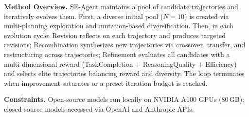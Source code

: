 \begin{tcolorbox}
\smallskip
\textbf{Method Overview.} SE-Agent maintains a pool of candidate trajectories and iteratively evolves them. First, a diverse initial pool ($N=10$) is created via multi-planning exploration and mutation-based diversification. Then, in each evolution cycle: Revision reflects on each trajectory and produces targeted revisions; Recombination synthesizes new trajectories via crossover, transfer, and restructuring across trajectories; Refinement evaluates all candidates with a multi-dimensional reward (TaskCompletion $+$ ReasoningQuality $+$ Efficiency) and selects elite trajectories balancing reward and diversity. The loop terminates when improvement saturates or a preset iteration budget is reached.

\smallskip
\textbf{Constraints.} Open-source models run locally on NVIDIA A100 GPUs (80\,GB); closed-source models accessed via OpenAI and Anthropic APIs.
\end{tcolorbox}

